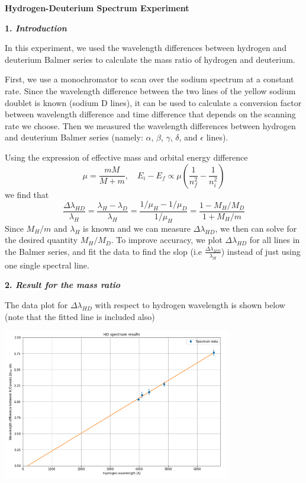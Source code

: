 \documentclass[12pt]{article}
\begin{document}
\textbf{Hydrogen-Deuterium Spectrum Experiment}
\bigskip

\textbf{1. \textit{Introduction}}
\smallskip


In this experiment, we used the wavelength differences between hydrogen and deuterium Balmer series to calculate the mass ratio of hydrogen and deuterium.

First, we use a monochromator to scan over the sodium spectrum at a constant rate. Since the wavelength difference between the two lines of the yellow sodium doublet is known (sodium D lines), it can be used to calculate a conversion factor between wavelength difference and time difference that depends on the scanning rate we choose. Then we measured the wavelength differences between hydrogen and deuterium Balmer series (namely: $\alpha$, $\beta$, $\gamma$, $\delta$, and $\epsilon$ lines).

Using the expression of effective mass and orbital energy difference
$$\mu = \frac{mM}{M+m}, \quad E_i -E_f \propto \mu (\frac{1}{n_f^2} - \frac{1}{n_i^2}) $$
we find that 
$$\frac{\Delta \lambda_{HD}}{\lambda_H} =  \frac{\lambda_H - \lambda_D}{\lambda_H}= \frac{1/ \mu_H - 1/ \mu_D}{1/\mu_H} = \frac{1- M_H / M_D}{1+M_H/m}$$
Since $M_H/m$ and $\lambda_H$ is known and we can measure $\Delta \lambda_{HD}$, we then can solve for the desired quantity $M_H/M_D$. To improve accuracy, we plot $\Delta \lambda_{HD}$ for all lines in the Balmer series, and fit the data to find the slop (i.e  $\frac{\Delta \lambda_{HD}}{\lambda_H}$) instead of just using one single spectral line.
\bigskip

\textbf{2. \textit{Result for the mass ratio}}
\smallskip

The data plot for $\Delta \lambda_{HD}$ with respect to hydrogen wavelength is shown below (note that the fitted line is included also)
\smallskip

\includegraphics[width=10cm]{wavelength_difference}
\smallskip
\end{document}
